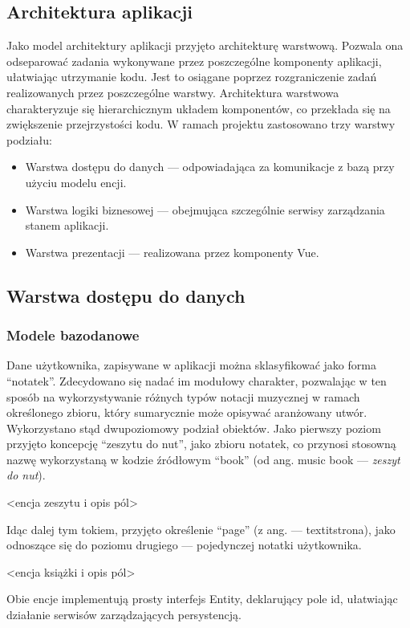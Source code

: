 \subsection{Architektura aplikacji}
Jako model architektury aplikacji przyjęto architekturę warstwową. Pozwala ona odseparować zadania wykonywane przez
poszczególne komponenty aplikacji, ułatwiając utrzymanie kodu. Jest to osiągane poprzez rozgraniczenie zadań
realizowanych przez poszczególne warstwy. Architektura warstwowa charakteryzuje się hierarchicznym układem komponentów,
co przekłada się na zwiększenie przejrzystości kodu.
W ramach projektu zastosowano trzy warstwy podziału:
\begin{itemize}
	\item Warstwa dostępu do danych — odpowiadająca za komunikacje z bazą przy użyciu modelu encji.
	\item Warstwa logiki biznesowej — obejmująca szczególnie serwisy zarządzania stanem aplikacji.
	\item Warstwa prezentacji — realizowana przez komponenty Vue.
\end{itemize}

\subsection{Warstwa dostępu do danych}
\subsubsection{Modele bazodanowe}
Dane użytkownika, zapisywane w aplikacji można sklasyfikować jako forma \enquote{notatek}.
Zdecydowano się nadać im modułowy charakter, pozwalając w ten sposób na wykorzystywanie różnych typów notacji muzycznej
w ramach określonego zbioru, który sumarycznie może opisywać aranżowany utwór.
Wykorzystano stąd dwupoziomowy podział obiektów. Jako pierwszy poziom przyjęto koncepcję
\enquote{zeszytu do nut}, jako zbioru notatek,
co przynosi stosowną nazwę wykorzystaną w kodzie źródłowym \enquote{book} (od ang.
music book — \textit{zeszyt do nut}).

<encja zeszytu i opis pól>

Idąc dalej tym tokiem, przyjęto określenie \enquote{page} (z ang. — textit{strona}),
jako odnoszące się do poziomu drugiego — pojedynczej notatki użytkownika.

<encja książki i opis pól>

Obie encje implementują prosty interfejs Entity, deklarujący pole id,
ułatwiając działanie serwisów zarządzających persystencją.

